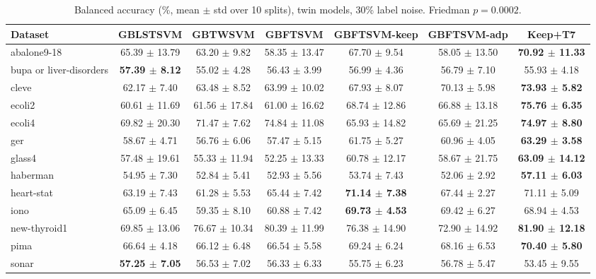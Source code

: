 \begin{table}[t]
\centering\small
\caption{Balanced accuracy (\%, mean $\pm$ std over 10 splits), twin models, 30\% label noise. Friedman $p = 0.0002$.}
\begin{tabular}{lcccccc}
\toprule
Dataset & GBLSTSVM & GBTWSVM & GBFTSVM & GBFTSVM-keep & GBFTSVM-adp & Keep+T7 \\
\midrule
abalone9-18 & 65.39 $\pm$ 13.79 & 63.20 $\pm$ 9.82 & 58.35 $\pm$ 13.47 & 67.70 $\pm$ 9.54 & 58.05 $\pm$ 13.50 & \textbf{70.92 $\pm$ 11.33} \\
bupa or liver-disorders & \textbf{57.39 $\pm$ 8.12} & 55.02 $\pm$ 4.28 & 56.43 $\pm$ 3.99 & 56.99 $\pm$ 4.36 & 56.79 $\pm$ 7.10 & 55.93 $\pm$ 4.18 \\
cleve & 62.17 $\pm$ 7.40 & 63.48 $\pm$ 8.52 & 63.99 $\pm$ 10.02 & 67.93 $\pm$ 8.07 & 70.13 $\pm$ 5.98 & \textbf{73.93 $\pm$ 5.82} \\
ecoli2 & 60.61 $\pm$ 11.69 & 61.56 $\pm$ 17.84 & 61.00 $\pm$ 16.62 & 68.74 $\pm$ 12.86 & 66.88 $\pm$ 13.18 & \textbf{75.76 $\pm$ 6.35} \\
ecoli4 & 69.82 $\pm$ 20.30 & 71.47 $\pm$ 7.62 & 74.84 $\pm$ 11.08 & 65.93 $\pm$ 14.82 & 65.69 $\pm$ 21.25 & \textbf{74.97 $\pm$ 8.80} \\
ger & 58.67 $\pm$ 4.71 & 56.76 $\pm$ 6.06 & 57.47 $\pm$ 5.15 & 61.75 $\pm$ 5.27 & 60.96 $\pm$ 4.05 & \textbf{63.29 $\pm$ 3.58} \\
glass4 & 57.48 $\pm$ 19.61 & 55.33 $\pm$ 11.94 & 52.25 $\pm$ 13.33 & 60.78 $\pm$ 12.17 & 58.67 $\pm$ 21.75 & \textbf{63.09 $\pm$ 14.12} \\
haberman & 54.95 $\pm$ 7.30 & 52.84 $\pm$ 5.41 & 52.93 $\pm$ 5.56 & 53.74 $\pm$ 7.43 & 52.06 $\pm$ 2.92 & \textbf{57.11 $\pm$ 6.03} \\
heart-stat & 63.19 $\pm$ 7.43 & 61.28 $\pm$ 5.53 & 65.44 $\pm$ 7.42 & \textbf{71.14 $\pm$ 7.38} & 67.44 $\pm$ 2.27 & 71.11 $\pm$ 5.09 \\
iono & 65.09 $\pm$ 6.45 & 59.35 $\pm$ 8.10 & 60.88 $\pm$ 7.42 & \textbf{69.73 $\pm$ 4.53} & 69.42 $\pm$ 6.27 & 68.94 $\pm$ 4.53 \\
new-thyroid1 & 69.85 $\pm$ 13.06 & 76.67 $\pm$ 10.34 & 80.39 $\pm$ 11.99 & 76.38 $\pm$ 14.90 & 72.90 $\pm$ 14.92 & \textbf{81.90 $\pm$ 12.18} \\
pima & 66.64 $\pm$ 4.18 & 66.12 $\pm$ 6.48 & 66.54 $\pm$ 5.58 & 69.24 $\pm$ 6.24 & 68.16 $\pm$ 6.53 & \textbf{70.40 $\pm$ 5.80} \\
sonar & \textbf{57.25 $\pm$ 7.05} & 56.53 $\pm$ 7.02 & 56.33 $\pm$ 6.33 & 55.75 $\pm$ 6.23 & 56.78 $\pm$ 5.47 & 53.45 $\pm$ 9.55 \\

\end{tabular}
\end{table}
